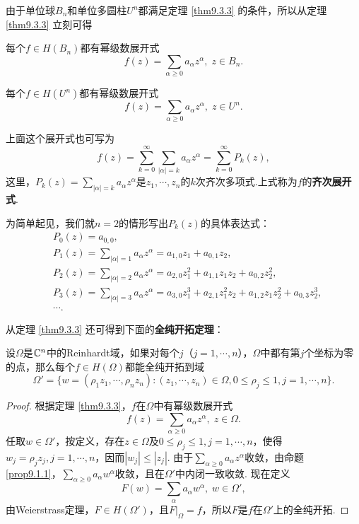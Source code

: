 由于单位球$B_n$和单位多圆柱$U^n$都满足定理 \ref{thm9.3.3} 的条件，所以从定理 \ref{thm9.3.3} 立刻可得
\begin{theorem}\label{thm9.3.4}
每个$f\in H(B_n)$都有幂级数展开式
\[f(z)=\sum_{\alpha\ge0}a_\alpha z^\alpha,\;z\in B_n.\]
\end{theorem}

\begin{theorem}\label{thm9.3.5}
每个$f\in H(U^n)$都有幂级数展开式
\[f(z)=\sum_{\alpha\ge0}a_\alpha z^\alpha,\;z\in U^n.\]
\end{theorem}

上面这个展开式也可写为
\[f(z)=\sum_{k=0}^\infty\sum_{|\alpha|=k}a_\alpha z^\alpha=\sum_{k=0}^\infty P_k(z),\]
这里，$P_k(z)=\sum_{|\alpha|=k}a_\alpha z^\alpha$是$z_1,\cdots,z_n$的$k$次齐次多项式.上式称为$f$的\textbf{齐次展开式}.

为简单起见，我们就$n=2$的情形写出$P_k(z)$的具体表达式：
\begin{align*}
&P_0(z)=a_{0,0},\\
&P_1(z)=\sum_{|\alpha|=1}a_\alpha z^\alpha=a_{1,0}z_1+a_{0,1}z_2,\\
&P_2(z)=\sum_{|\alpha|=2}a_\alpha z^\alpha=a_{2,0}z_1^2+a_{1,1}z_1z_2+a_{0,2}z_2^2,\\
&P_3(z)=\sum_{|\alpha|=3}a_\alpha z^\alpha=a_{3,0}z_1^3+a_{2,1}z_1^2z_2+a_{1,2}z_1z_2^2+a_{0,3}z_2^3,\\
&\cdots.
\end{align*}

从定理 \ref{thm9.3.3} 还可得到下面的\textbf{全纯开拓定理}：
\begin{theorem}\label{thm9.3.6}
设$\Omega$是$\mathbb C^n$中的Reinhardt域，如果对每个$j$（$j=1,\cdots,n$），$\Omega$中都有第$j$个坐标为零的点，那么每个$f\in H(\Omega)$都能全纯开拓到域
\[\Omega'=\{w=(\rho_1z_1,\cdots,\rho_nz_n):(z_1,\cdots,z_n)\in\Omega,0\le\rho_j\le1,
j=1,\cdots,n\}.\]
\end{theorem}
\begin{proof}
根据定理 \ref{thm9.3.3}，$f$在$\Omega$中有幂级数展开式
\[f(z)=\sum_{\alpha\ge0}a_\alpha z^\alpha,\;z\in\Omega.\]
任取$w\in\Omega'$，按定义，存在$z\in\Omega$及$0\le\rho_j\le1,j=1,\cdots,n$，使得$w_j=\rho_jz_j,j=1,\cdots,n$，因而$|w_j|\le|z_j|$. 由于$\sum_{\alpha\ge 0}a_\alpha z^\alpha$收敛，由命题 \ref{prop9.1.1}，$\sum_{\alpha\ge0}a_\alpha w^\alpha$收敛，且在$\Omega'$中内闭一致收敛. 现在定义
\[F(w)=\sum_{\alpha}a_\alpha w^\alpha,\;w\in\Omega',\]
由Weierstrass定理，$F\in H(\Omega')$，且$F\big|_\Omega=f$，所以$F$是$f$在$\Omega'$上的全纯开拓.
\end{proof}


